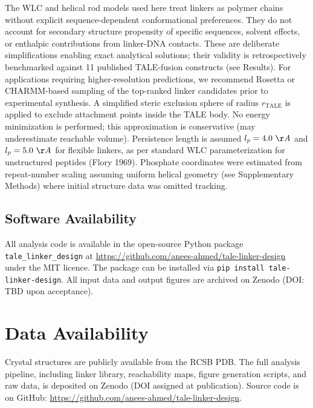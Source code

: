 \documentclass[11pt,a4paper]{article}
\newcommand{\angstrom}{\AA}
\newcommand{\pkg}{\texttt{tale\_linker\_design}}
\begin{document}
The WLC and helical rod models used here treat linkers as polymer chains without explicit
sequence-dependent conformational preferences. They do not account for secondary structure
propensity of specific sequences, solvent effects, or enthalpic contributions from linker-DNA
contacts. These are deliberate simplifications enabling exact analytical solutions; their
validity is retrospectively benchmarked against 11 published TALE-fusion constructs 
(see Results). For applications requiring higher-resolution predictions, we recommend 
Rosetta or CHARMM-based sampling of the top-ranked linker candidates prior to experimental 
synthesis.
A simplified steric exclusion sphere of radius $r_{\mathrm{TALE}}$ is applied to exclude
attachment points inside the TALE body. No energy minimization is performed; this approximation
is conservative (may underestimate reachable volume). Persistence length is assumed $l_p = 4.0~\angstrom$
and $l_p = 5.0~\angstrom$ for flexible linkers, as per standard WLC parameterization for unstructured peptides
(Flory 1969). Phosphate coordinates were estimated from repeat-number scaling assuming uniform
helical geometry (see Supplementary Methods) where initial structure data was omitted tracking.

\subsection{Software Availability}

All analysis code is available in the open-source Python package \pkg{} at
\url{https://github.com/anees-ahmed/tale-linker-design} under the MIT licence.
The package can be installed via \texttt{pip install tale-linker-design}.
All input data and output figures are archived on Zenodo (DOI: TBD upon acceptance).

\section*{Data Availability}

Crystal structures are publicly available from the RCSB PDB. The full analysis
pipeline, including linker library, reachability maps, figure generation scripts,
and raw data, is deposited on Zenodo (DOI assigned at publication). Source code
is on GitHub: \url{https://github.com/anees-ahmed/tale-linker-design}.
\end{document}
